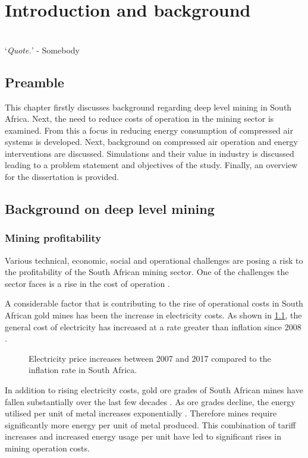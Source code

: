 \chapter{Introduction and background}  %
\thispagestyle{empty}
\vspace{38em}
\hrulefill
\\
\enquote*{\textit{Quote.}} - Somebody\\
\newpage

\section{Preamble}
This chapter firstly discusses background regarding deep level mining in South Africa. Next, the need to reduce costs of operation in the mining sector is examined. From this a focus in reducing energy consumption of compressed air systems is developed. Next, background on compressed air operation and energy interventions are discussed. Simulations and their value in industry is discussed leading to a problem statement and objectives of the study. Finally, an overview for the dissertation is provided.
\section{Background on deep level mining}
	\subsection{Mining profitability}
	 	Various technical, economic, social and operational challenges are posing a risk to the profitability of the South African mining sector. One of the challenges the sector faces  is a rise in the cost of operation \cite{neingo2016trends}.
	 	\par
		A considerable factor that is contributing to the rise of operational costs in South African gold mines has been the increase in electricity costs. As shown in \cref{fig: Eskom tariffs}, the general cost of electricity has increased at a rate greater than inflation since 2008 \cite{Eskom2013Tariffs}.
		\begin{figure}[h]
			\centering
			\fbox{}
			\caption[Electricity price increases between 2007 and 2017 compared to the inflation rate in South Africa..]{Electricity price increases between 2007 and 2017 \cite{Eskom2013Tariffs} compared to the inflation rate in South Africa.\protect\footnotemark[1] }
			\label{fig: Eskom tariffs}
		\end{figure}
		\par
		In addition to rising electricity costs, gold ore grades of South African mines have fallen substantially over the last few decades \cite{mudd2007global}. As ore grades decline, the energy utilised per unit of metal increases exponentially \cite{muller2010numerical}. Therefore mines require significantly more energy per unit of metal produced. This combination of tariff increases and increased energy usage per unit have led to significant rises in mining operation costs.

